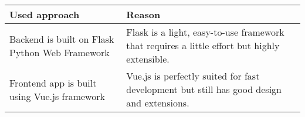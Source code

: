 \begin{longtable}[]{@{}ll@{}}
\toprule
\begin{minipage}[b]{0.47\columnwidth}\raggedright
Used approach\strut
\end{minipage} & \begin{minipage}[b]{0.47\columnwidth}\raggedright
Reason\strut
\end{minipage}\tabularnewline
\midrule
\endhead
\begin{minipage}[t]{0.47\columnwidth}\raggedright
Backend is built on Flask Python Web Framework\strut
\end{minipage} & \begin{minipage}[t]{0.47\columnwidth}\raggedright
Flask is a light, easy-to-use framework that requires a little effort
but highly extensible.\strut
\end{minipage}\tabularnewline
\begin{minipage}[t]{0.47\columnwidth}\raggedright
Frontend app is built using Vue.js framework\strut
\end{minipage} & \begin{minipage}[t]{0.47\columnwidth}\raggedright
Vue.js is perfectly suited for fast development but still has good
design and extensions.\strut
\end{minipage}\tabularnewline
\bottomrule
\end{longtable}
